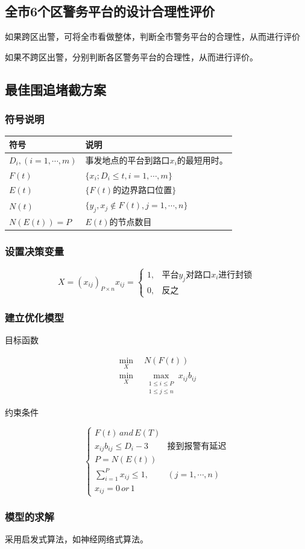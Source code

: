 \subsection{全市6个区警务平台的设计合理性评价}
如果跨区出警，可将全市看做整体，判断全市警务平台的合理性，从而进行评价\par
如果不跨区出警，分别判断各区警务平台的合理性，从而进行评价。
\subsection{最佳围追堵截方案}
\subsubsection{符号说明}
\begin{table}[h]
\begin{tabular}{ll}
\hline
符号 & 说明 \\ \hline
$D_i, (i=1,\cdots,m)$ & 事发地点的平台到路口$x_i$的最短用时。 \\
$F(t)$ & $\{x_i;D_i\leq t, i=1,\cdots,m\}$ \\
$E(t)$ & $\{F(t)的边界路口位置\}$ \\
$N(t)$ & $\{y_j, x_j\notin F(t), j=1,\cdots,n\}$ \\
$N(E(t)) = P$ & $E(t)$的节点数目 \\ \hline
\end{tabular}
\end{table}
\subsubsection{设置决策变量}
\begin{equation*}
X = (x_{ij})_{P\times n}
x_{ij}=\begin{cases}
1, & \text{平台$y_j$对路口$x_i$进行封锁} \\
0, & \text{反之}
\end{cases}
\end{equation*}
\subsubsection{建立优化模型}
{\heiti 目标函数}\par
\begin{align*}
\min_{X}\quad N(F(t)) \\
\min_{X}\quad\max_{\substack{1\leq i\leq P\\ 1\leq j\leq n}}x_{ij}b_{ij}
\end{align*}

{\heiti 约束条件}\par
\begin{equation*}
\begin{cases}
F(t)\,and\,E(T) & \\
x_{ij}b_{ij} \leq D_i-3 & \text{接到报警有延迟} \\
P=N(E(t)) & \\
\sum_{i=1}^{P}x_{ij}\leq 1, & (j=1,\cdots,n) \\
x_{ij}=0 \,or\, 1 &
\end{cases}
\end{equation*}
\subsubsection{模型的求解}
采用启发式算法，如神经网络式算法。